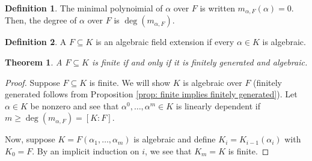 \documentclass[
    parskip=half,
    toc=flat,
    toc=sectionentrydotfill,
]{scrartcl}  %
\theoremstyle{definition}
\newtheorem{definition}{Definition}[section]
\theoremstyle{plain}
\newtheorem{theorem}{Theorem}[section]
\theoremstyle{remark}
\begin{document}
\begin{definition}
    The minimal polynoimial of $\alpha$ over $F$ is written $m_{\alpha,F}(\alpha)=0$.
    Then, the degree of $\alpha$ over $F$ is $\deg(m_{\alpha,F})$.
\end{definition}

\begin{definition}
    A $F\subseteq K$ is an algebraic field extension if every $\alpha\in K$ is algebraic.
\end{definition}

\begin{theorem}
    A $F\subseteq K$ is finite if and only if it is finitely generated and algebraic.
\end{theorem}

\begin{proof}
    Suppose $F\subseteq K$ is finite.
    We will show $K$ is algebraic over $F$ (finitely generated follows from
    Proposition \ref{prop: finite implies finitely generated}).
    Let $\alpha\in K$ be nonzero and see that $\alpha^0,\dots,\alpha^m\in K$ is
    linearly dependent if $m\geq\deg(m_{\alpha,F})=[K:F]$.

    Now, suppose $K=F(\alpha_1,\dots,\alpha_m)$ is algebraic and define
    $K_i=K_{i-1}(\alpha_i)$ with $K_0=F$.
    By an implicit induction on $i$, we see that $K_m=K$ is finite.
\end{proof}
\end{document}
